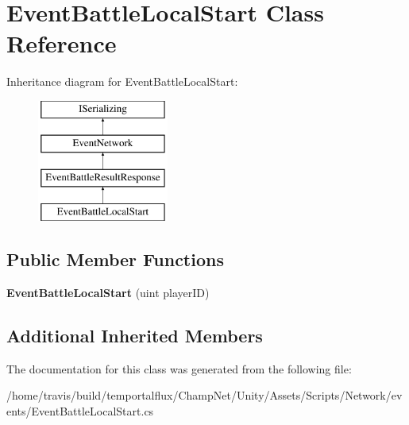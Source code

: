 \hypertarget{class_event_battle_local_start}{\section{Event\-Battle\-Local\-Start Class Reference}
\label{class_event_battle_local_start}
}
Inheritance diagram for Event\-Battle\-Local\-Start\-:\begin{figure}[H]
\begin{center}
\leavevmode
\includegraphics[height=4.000000cm]{class_event_battle_local_start}
\end{center}
\end{figure}
\subsection*{Public Member Functions}
\begin{DoxyCompactItemize}
\item 
\hypertarget{class_event_battle_local_start_a28292a2cdc78a14adc17ea50c0add8b2}{{\bfseries Event\-Battle\-Local\-Start} (uint player\-I\-D)}\label{class_event_battle_local_start_a28292a2cdc78a14adc17ea50c0add8b2}

\end{DoxyCompactItemize}
\subsection*{Additional Inherited Members}


The documentation for this class was generated from the following file\-:\begin{DoxyCompactItemize}
\item 
/home/travis/build/temportalflux/\-Champ\-Net/\-Unity/\-Assets/\-Scripts/\-Network/events/Event\-Battle\-Local\-Start.\-cs\end{DoxyCompactItemize}
